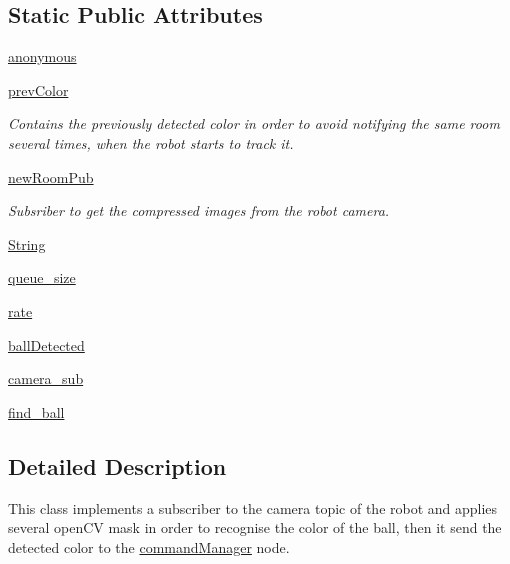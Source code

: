 \subsection*{Static Public Attributes}
\begin{DoxyCompactItemize}
\item 
\hyperlink{classroomDetector_1_1roomDetector_ac3ba7d2b6d48205de38cd18b333237d6}{anonymous}
\item 
\hyperlink{classroomDetector_1_1roomDetector_a1e899d16548ade375ed0b0dc6e1d9d98}{prev\+Color}
\begin{DoxyCompactList}\small\item\em Contains the previously detected color in order to avoid notifying the same room several times, when the robot starts to track it. \end{DoxyCompactList}\item 
\hyperlink{classroomDetector_1_1roomDetector_a35a2705eee8284eaad169dd0830fc6de}{new\+Room\+Pub}
\begin{DoxyCompactList}\small\item\em Subsriber to get the compressed images from the robot camera. \end{DoxyCompactList}\item 
\hyperlink{classroomDetector_1_1roomDetector_a14b6749ddaf264a41497904c0513ed9b}{String}
\item 
\hyperlink{classroomDetector_1_1roomDetector_a86aaaea08936260cb6e591c10b0dfeae}{queue\+\_\+size}
\item 
\hyperlink{classroomDetector_1_1roomDetector_ad3dbc1e4c7a827af098c86101198a1f4}{rate}
\item 
\hyperlink{classroomDetector_1_1roomDetector_a2a904c657007f56412c9e495cc254cad}{ball\+Detected}
\item 
\hyperlink{classroomDetector_1_1roomDetector_a0a32f7c136b2b46325c0e36275c6fb57}{camera\+\_\+sub}
\item 
\hyperlink{classroomDetector_1_1roomDetector_a86847f178ca59553c205557f2de199d8}{find\+\_\+ball}
\end{DoxyCompactItemize}


\subsection{Detailed Description}
This class implements a subscriber to the camera topic of the robot and applies several open\+CV mask in order to recognise the color of the ball, then it send the detected color to the \hyperlink{namespacecommandManager}{command\+Manager} node. 




